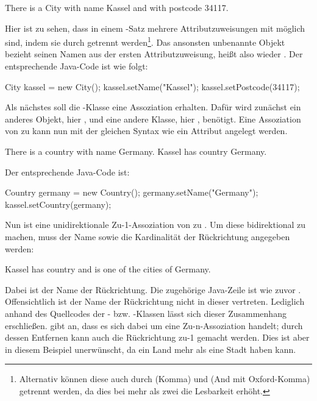 \begin{codeblock}
    There is a City with name Kassel and with postcode 34117.
\end{codeblock}

Hier ist zu sehen, dass in einem -Satz mehrere Attributzuweisungen mit  möglich sind, indem sie durch  getrennt werden\footnote{
Alternativ können diese auch durch \code{,} (Komma) und  (And mit Oxford-Komma) getrennt werden, da dies bei mehr als zwei  die Lesbarkeit erhöht.
}.
Das ansonsten unbenannte Objekt bezieht seinen Namen aus der ersten Attributzuweisung,
heißt also wieder .
Der entsprechende Java-Code ist wie folgt:

\begin{jcodeblock}
    City kassel = new City();
    kassel.setName("Kassel");
    kassel.setPostcode(34117);
\end{jcodeblock}

Als nächstes soll die -Klasse eine Assoziation erhalten.
Dafür wird zunächst ein anderes Objekt, hier , und eine andere Klasse, hier , benötigt.
Eine Assoziation von  zu  kann nun mit der gleichen Syntax wie ein Attribut angelegt werden.

\begin{codeblock}
    There is a country with name Germany.
    Kassel has country Germany.
\end{codeblock}

Der entsprechende Java-Code ist:

\begin{jcodeblock}
    Country germany = new Country();
    germany.setName("Germany");
    kassel.setCountry(germany);
\end{jcodeblock}

Nun ist  eine unidirektionale Zu-1-Assoziation von  zu .
Um diese bidirektional zu machen, muss der Name sowie die Kardinalität der Rückrichtung angegeben werden:

\begin{codeblock}
    Kassel has country and is one of the cities of Germany.
\end{codeblock}

Dabei ist  der Name der Rückrichtung.
Die zugehörige Java-Zeile ist wie zuvor .
Offensichtlich ist der Name der Rückrichtung nicht in dieser vertreten.
Lediglich anhand des Quellcodes der - bzw. -Klassen lässt sich dieser Zusammenhang erschließen.
 gibt an, dass es sich dabei um eine Zu-n-Assoziation handelt;
durch dessen Entfernen kann auch die Rückrichtung zu-1 gemacht werden.
Dies ist aber in diesem Beispiel unerwünscht, da ein Land mehr als eine Stadt haben kann.

